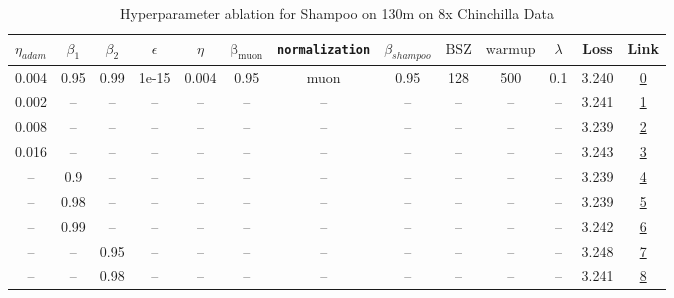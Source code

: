\begin{table}[H]
\centering
\caption{Hyperparameter ablation for Shampoo on 130m on 8x Chinchilla Data}
\label{tab:ablation_shampoo_130m_8}
\begin{tabular}{ccccccccccccc}
\toprule
$\eta_{adam}$ & $\beta_1$ & $\beta_2$ & $\epsilon$ & $\eta$ & $\mathrm{\beta_{muon}}$ & \texttt{normalization} & $\beta_{shampoo}$ & $\mathrm{BSZ}$ & $\mathrm{warmup}$ & $\lambda$ & Loss & Link \\
\midrule
0.004 & 0.95 & 0.99 & 1e-15 & 0.004 & 0.95 & muon & 0.95 & 128 & 500 & 0.1 & 3.240 & \href{https://wandb.ai/stanford-mercury/optimizer-scaling/runs/sweep-130m-21B-mudamk138b15lr0.004-alr0.004-wd0.1-minlr0-warmup5-239972}{0} \\
\midrule
0.002 & -- & -- & -- & -- & -- & -- & -- & -- & -- & -- & 3.241 & \href{https://wandb.ai/stanford-mercury/optimizer-scaling/runs/sweep-130m-21B-mudamv26ac19lr0.004-alr0.002-wd0.1-minlr0-warmup5-5905e2}{1} \\
0.008 & -- & -- & -- & -- & -- & -- & -- & -- & -- & -- & 3.239 & \href{https://wandb.ai/stanford-mercury/optimizer-scaling/runs/sweep-130m-21B-mudamv9c90fdlr0.004-alr0.008-wd0.1-minlr0-warmup5-684d36}{2} \\
0.016 & -- & -- & -- & -- & -- & -- & -- & -- & -- & -- & 3.243 & \href{https://wandb.ai/stanford-mercury/optimizer-scaling/runs/sweep-130m-21B-mudamv0a167flr0.004-alr0.016-wd0.1-minlr0-warmup5-f41317}{3} \\
-- & 0.9 & -- & -- & -- & -- & -- & -- & -- & -- & -- & 3.239 & \href{https://wandb.ai/stanford-mercury/optimizer-scaling/runs/sweep-130m-21B-mudamvc0c6b9lr0.004-alr0.004-wd0.1-minlr0-warmup5-6ebcb4}{4} \\
-- & 0.98 & -- & -- & -- & -- & -- & -- & -- & -- & -- & 3.239 & \href{https://wandb.ai/stanford-mercury/optimizer-scaling/runs/sweep-130m-21B-mudamvc8ffa7lr0.004-alr0.004-wd0.1-minlr0-warmup5-9f4a73}{5} \\
-- & 0.99 & -- & -- & -- & -- & -- & -- & -- & -- & -- & 3.242 & \href{https://wandb.ai/stanford-mercury/optimizer-scaling/runs/sweep-130m-21B-mudamvbcec8dlr0.004-alr0.004-wd0.1-minlr0-warmup5-21c38c}{6} \\
-- & -- & 0.95 & -- & -- & -- & -- & -- & -- & -- & -- & 3.248 & \href{https://wandb.ai/stanford-mercury/optimizer-scaling/runs/sweep-130m-21B-mudamv4d53eelr0.004-alr0.004-wd0.1-minlr0-warmup5-df4517}{7} \\
-- & -- & 0.98 & -- & -- & -- & -- & -- & -- & -- & -- & 3.241 & \href{https://wandb.ai/stanford-mercury/optimizer-scaling/runs/sweep-130m-21B-mudamv4a02balr0.004-alr0.004-wd0.1-minlr0-warmup5-342538}{8} \\

\end{tabular}
\end{table}
